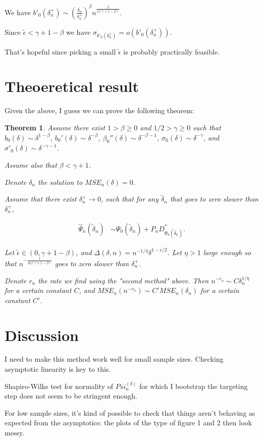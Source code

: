 \documentclass[a4paper]{article}
\newtheorem{thm}{Theorem}
\begin{document}
We have $b'_0(\delta^+_n) \sim  \left(\frac{\delta_n}{\delta_n^+}\right)^{\beta} n^\frac{\beta}{2(\gamma + 1 - \beta)}$.

Since $\tilde{\epsilon} < \gamma + 1 - \beta$ we have $\sigma_{b'_0(\delta^+_n)} = o(b'_0(\delta^+_n))$.


\medskip

That's hopeful since picking a small $\tilde{\epsilon}$ is probably practically feasible.

\medskip

\section{Theoeretical result}

Given the above, I guess we can prove the following theorem:

\begin{thm}
Assume there exist $1 > \beta \geq 0$ and $1/2 > \gamma \geq 0$ such that $b_0(\delta) \sim \delta^{1 - \beta}$, $b_0'(\delta) \sim \delta^{-\beta}$, $\beta_0''(\delta) \sim \delta^{-\beta - 1}$, $\sigma_0(\delta) \sim \delta^{-\gamma}$, 
and $\sigma'_0(\delta) \sim \delta^{-\gamma - 1}$. 

Assume also that $\beta < \gamma + 1$.


Denote $\delta_n$ the solution to $MSE_n(\delta) = 0$.


Assume that there exist $\delta_n^+ \rightarrow 0$, such that for any $\tilde{\delta}_n$ that goes to zero slower than $\delta_n^+$, 

\begin{align*}
\hat{\Psi}_n(\tilde{\delta}_n) &\sim \Psi_0(\tilde{\delta}_n) + P_n D^*_{\Psi_0(\tilde{\delta}_n)}.
\end{align*}

Let $\tilde{\epsilon} \in (0, \gamma + 1 - \beta)$, and $\Delta(\delta, n) = n^{-1/4} \delta^{1 - \tilde{\epsilon} / 2}$. Let $\eta > 1$ large enough so that $n^{-\frac{1}{2 \eta (\gamma + 1 - \beta)}}$ goes to zero slower than $\delta_n^+$.

Denote $r_n$ the rate we find using the "second method" above. Then $n^{-r_n} \sim C \delta_n^{1 / \eta}$ for a certain constant $C$, and $MSE_n(n^{-r_n}) \sim C' MSE_n(\delta_n)$ for a certain constant $C'$.

\end{thm}

\section{Discussion}

I need to make this method work well for small sample sizes. Checking asymptotic linearity is key to this.

Shapiro-Wilks test for normality of $Psi_n^(\delta)$ for which I bootstrap the targeting step does not seem to be stringent enough.

For low sample sizes, it's kind of possible to check that things aren't behaving as expected from the asymptotics: the plots of the type of figure 1 and 2 then look messy.
\end{document}

